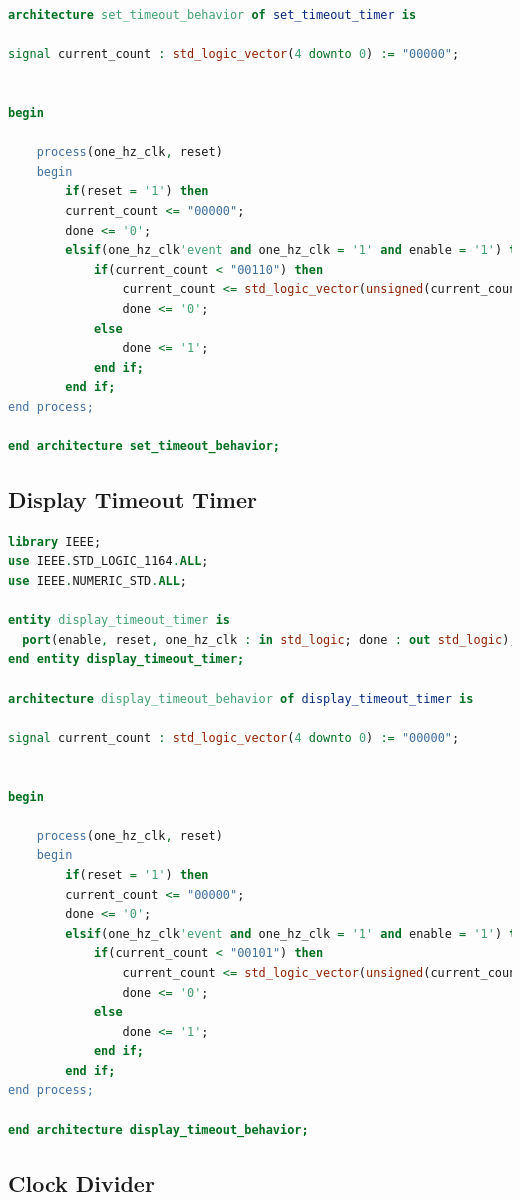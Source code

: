 \documentclass[11pt]{article}
\begin{document}
\begin{appendices}
\begin{lstlisting}[language=VHDL]
architecture set_timeout_behavior of set_timeout_timer is

signal current_count : std_logic_vector(4 downto 0) := "00000";


begin

    process(one_hz_clk, reset)
    begin
        if(reset = '1') then
	    current_count <= "00000";
	    done <= '0';
        elsif(one_hz_clk'event and one_hz_clk = '1' and enable = '1') then
            if(current_count < "00110") then
                current_count <= std_logic_vector(unsigned(current_count) + 1);
                done <= '0';
            else
                done <= '1';
            end if;
        end if;
end process;

end architecture set_timeout_behavior;

\end{lstlisting}

\subsection{Display Timeout Timer}

\begin{lstlisting}[language=VHDL]
library IEEE;
use IEEE.STD_LOGIC_1164.ALL;
use IEEE.NUMERIC_STD.ALL;

entity display_timeout_timer is
  port(enable, reset, one_hz_clk : in std_logic; done : out std_logic);
end entity display_timeout_timer;

architecture display_timeout_behavior of display_timeout_timer is

signal current_count : std_logic_vector(4 downto 0) := "00000";


begin

    process(one_hz_clk, reset)
    begin
        if(reset = '1') then
	    current_count <= "00000";
	    done <= '0';
        elsif(one_hz_clk'event and one_hz_clk = '1' and enable = '1') then
            if(current_count < "00101") then
                current_count <= std_logic_vector(unsigned(current_count) + 1);
                done <= '0';
            else
                done <= '1';
            end if;
        end if;
end process;

end architecture display_timeout_behavior;

\end{lstlisting}

\subsection{Clock Divider}


\end{appendices}
\end{document}
